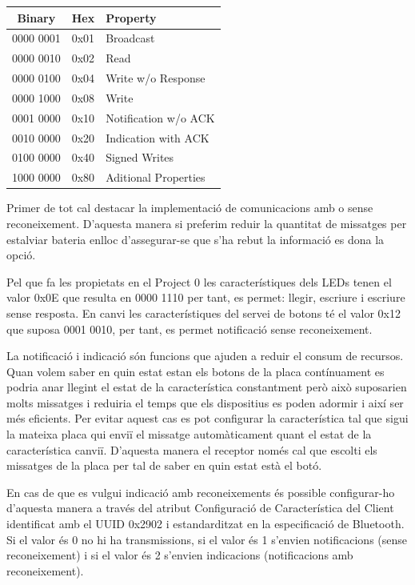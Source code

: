 \begin{center}
	\begin{tabular}{|c|c|l|}
		\hline
		Binary	&	Hex		&	Property	\\	\hline
		0000 0001	&	0x01	&	Broadcast\\	\hline
		0000 0010	&	0x02	&	Read	\\	\hline
		0000 0100	&	0x04	&	Write w/o Response	\\	\hline
		0000 1000	&	0x08	&	Write	\\	\hline
		0001 0000	&	0x10	&	Notification w/o ACK	\\	\hline
		0010 0000	&	0x20	&	Indication with ACK	\\	\hline
		0100 0000	&	0x40	&	Signed Writes	\\	\hline
		1000 0000	&	0x80	&	Aditional Properties	\\	\hline
	\end{tabular}
\end{center}

Primer de tot cal destacar la implementació de comunicacions amb o sense reconeixement. D'aquesta manera si preferim reduir la quantitat de missatges per estalviar bateria enlloc d'assegurar-se que s'ha rebut la informació es dona la opció.

Pel que fa les propietats en el Project 0 les característiques dels LEDs tenen el valor 0x0E que resulta en 0000 1110 per tant, es permet: llegir, escriure i escriure sense resposta.
En canvi les característiques del servei de botons té el valor 0x12 que suposa 0001 0010, per tant, es permet notificació sense reconeixement.

La notificació i indicació són funcions que ajuden a reduir el consum de recursos.
Quan volem saber en quin estat estan els botons de la placa contínuament es podria anar llegint el estat de la característica constantment però això suposarien molts missatges i reduiria el temps que els dispositius es poden adormir i així ser més eficients.
Per evitar aquest cas es pot configurar la característica tal que sigui la mateixa placa qui enviï el missatge automàticament quant el estat de la característica canviï.
D'aquesta manera el receptor només cal que escolti els missatges de la placa per tal de saber en quin estat està el botó.

En cas de que es vulgui indicació amb reconeixements és possible configurar-ho d'aquesta manera a través del atribut Configuració de Característica del Client identificat amb el UUID 0x2902 i estandarditzat en la especificació de Bluetooth.
Si el valor és 0 no hi ha transmissions, si el valor és 1 s'envien notificacions (sense reconeixement) i si el valor és 2 s'envien indicacions (notificacions amb reconeixement). 

